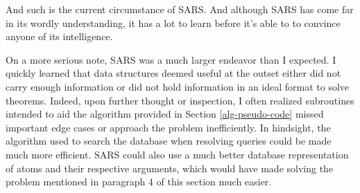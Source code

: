 \documentclass{article}
\begin{document}
  And such is the current circumstance of SARS. And although SARS has come far
  in its wordly understanding, it has a lot to learn before it's able to to
  convince anyone of its intelligence.

  On a more serious note, SARS was a much larger endeavor than I expected. I
  quickly learned that data structures deemed useful at the outset either did
  not carry enough information or did not hold information in an ideal format to
  solve theorems. Indeed, upon further thought or inspection, I often realized
  subroutines intended to aid the algorithm provided in Section
  \ref{alg-pseudo-code} missed important edge cases or approach the problem
  inefficiently. In hindsight, the algorithm used to search the database when
  resolving queries could be made much more efficient. SARS could also use a
  much better database representation of atoms and their respective arguments,
  which would have made solving the problem mentioned in paragraph 4 of this
  section much easier.
\end{document}
